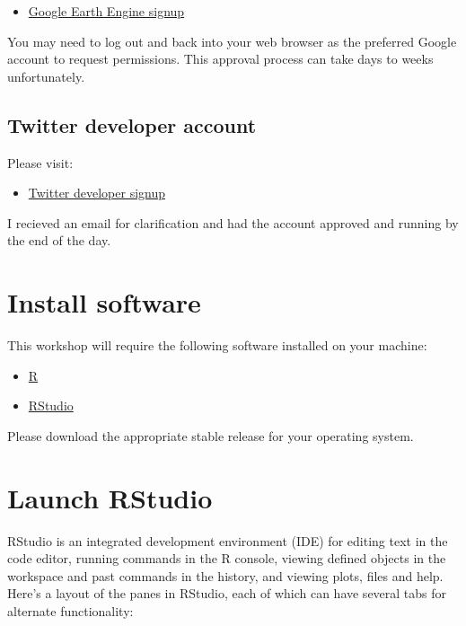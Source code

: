 \documentclass[]{book}
\providecommand{\tightlist}{%
  \setlength{\itemsep}{0pt}\setlength{\parskip}{0pt}}
\begin{document}
\begin{itemize}
\tightlist
\item
  \href{https://signup.earthengine.google.com/\#!/}{Google Earth Engine signup}
\end{itemize}

You may need to log out and back into your web browser as the preferred Google account to request permissions. This approval process can take days to weeks unfortunately.

\hypertarget{twitter-developer-account}{%
\subsection{Twitter developer account}\label{twitter-developer-account}}

Please visit:

\begin{itemize}
\tightlist
\item
  \href{https://developer.twitter.com/en/apply-for-access}{Twitter developer signup}
\end{itemize}

I recieved an email for clarification and had the account approved and running by the end of the day.

\hypertarget{install-software}{%
\section{Install software}\label{install-software}}

This workshop will require the following software installed on your machine:

\begin{itemize}
\tightlist
\item
  \href{http://cran.cnr.berkeley.edu/}{R}
\item
  \href{https://www.rstudio.com/products/rstudio/download/\#download}{RStudio}
\end{itemize}

Please download the appropriate stable release for your operating system.

\hypertarget{launch-rstudio}{%
\section{Launch RStudio}\label{launch-rstudio}}

RStudio is an integrated development environment (IDE) for editing text in the code editor, running commands in the R console, viewing defined objects in the workspace and past commands in the history, and viewing plots, files and help. Here's a layout of the panes in RStudio, each of which can have several tabs for alternate functionality:
\end{document}
